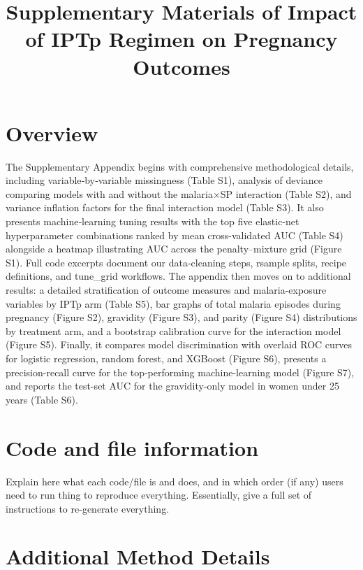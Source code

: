 \documentclass[
  letterpaper,
  DIV=11,
  numbers=noendperiod]{scrartcl}
\title{Supplementary Materials of Impact of IPTp Regimen on Pregnancy
Outcomes}
\author{}
\date{}
\begin{document}
\maketitle


\newpage{}

\section{Overview}\label{overview}

The Supplementary Appendix begins with comprehensive methodological
details, including variable‐by‐variable missingness (Table S1), analysis
of deviance comparing models with and without the malaria×SP interaction
(Table S2), and variance inflation factors for the final interaction
model (Table S3). It also presents machine‐learning tuning results with
the top five elastic-net hyperparameter combinations ranked by mean
cross-validated AUC (Table S4) alongside a heatmap illustrating AUC
across the penalty--mixture grid (Figure S1). Full code excerpts
document our data-cleaning steps, rsample splits, recipe definitions,
and tune\_grid workflows. The appendix then moves on to additional
results: a detailed stratification of outcome measures and
malaria-exposure variables by IPTp arm (Table S5), bar graphs of total
malaria episodes during pregnancy (Figure S2), gravidity (Figure S3),
and parity (Figure S4) distributions by treatment arm, and a bootstrap
calibration curve for the interaction model (Figure S5). Finally, it
compares model discrimination with overlaid ROC curves for logistic
regression, random forest, and XGBoost (Figure S6), presents a
precision-recall curve for the top‐performing machine-learning model
(Figure S7), and reports the test-set AUC for the gravidity-only model
in women under 25 years (Table S6).

\section{Code and file information}\label{code-and-file-information}

Explain here what each code/file is and does, and in which order (if
any) users need to run thing to reproduce everything. Essentially, give
a full set of instructions to re-generate everything.

\newpage{}

\section{Additional Method Details}\label{additional-method-details}
\end{document}
